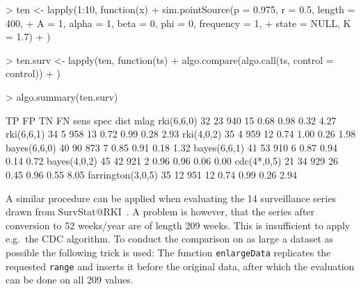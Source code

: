 \documentclass[a4paper,11pt]{article}
\begin{document}
\begin{Schunk}
\begin{Sinput}
> ten <- lapply(1:10, function(x) {
+     sim.pointSource(p = 0.975, r = 0.5, length = 400, 
+         A = 1, alpha = 1, beta = 0, phi = 0, frequency = 1, 
+         state = NULL, K = 1.7)
+ })
\end{Sinput}
\end{Schunk}
\begin{Schunk}
\begin{Sinput}
> ten.surv <- lapply(ten, function(ts) {
+     algo.compare(algo.call(ts, control = control))
+ })
\end{Sinput}
\end{Schunk}
\begin{Schunk}
\begin{Sinput}
> algo.summary(ten.surv)
\end{Sinput}
\end{Schunk}
\begin{Schunk}
\begin{Soutput}
                  TP FP  TN FN sens spec dist mlag
rki(6,6,0)        32 23 940 15 0.68 0.98 0.32 4.27
rki(6,6,1)        34  5 958 13 0.72 0.99 0.28 2.93
rki(4,0,2)        35  4 959 12 0.74 1.00 0.26 1.98
bayes(6,6,0)      40 90 873  7 0.85 0.91 0.18 1.32
bayes(6,6,1)      41 53 910  6 0.87 0.94 0.14 0.72
bayes(4,0,2)      45 42 921  2 0.96 0.96 0.06 0.00
cdc(4*,0,5)       21 34 929 26 0.45 0.96 0.55 8.05
farrington(3,0,5) 35 12 951 12 0.74 0.99 0.26 2.94
\end{Soutput}
\end{Schunk}

A similar procedure can be applied when evaluating the 14 surveillance
series drawn from SurvStat@RKI~\citep{survstat}. A problem is however,
that the series after conversion to 52 weeks/year are of length 209 weeks.
This is insufficient to apply e.g.\ the CDC algorithm. To conduct the
comparison on as large a dataset as possible the following trick is
used: The function \texttt{enlargeData} replicates the requested
\texttt{range} and inserts it before the original data, after which
the evaluation can be done on all 209 values.
\end{document}
